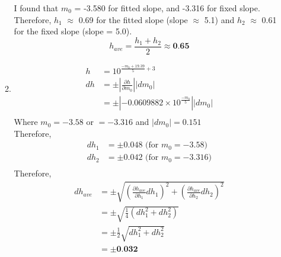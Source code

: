 \documentclass[10pt,letterpaper]{article}
\begin{document}
\begin{enumerate}
\begin{enumerate}
I found that $m_0$ = -3.580 for fitted slope, and -3.316 for fixed slope.\\

Therefore, $h_1$ $\approx$ 0.69 for the fitted slope (slope $\approx$ 5.1) and $h_2$ $\approx$ 0.61 for the fixed slope (slope = 5.0).\\

\begin{equation}\nonumber
h_{ave} = \frac{h_1 + h_2}{2} \approx \textbf{0.65}
\end{equation}

\item \begin{equation}\nonumber
\begin{split}
h & = 10^{\frac{- m_0+19.39}{5}+3}\\
dh & = \pm |\frac{\partial h}{\partial m_0}| |d m_0|\\
 & = \pm | -0.0609882 \times 10^{\frac{-m_0}{5}} | | d m_0 |\\
\end{split}
\end{equation}
Where $m_0 = -3.58$ or $= -3.316$ and $|d m_0| = 0.151$\\

Therefore,\\
\begin{equation}\nonumber
\begin{split}
dh_1 & = \pm 0.048 \text{ (for $m_0 = -3.58$)}\\
dh_2 & = \pm 0.042 \text{ (for $m_0 = -3.316$)}\\
\end{split}
\end{equation}
Therefore,\\
\begin{equation}\nonumber
\begin{split}
dh_{ave} & = \pm \sqrt{\left(\frac{\partial h_{ave}}{\partial h_1} dh_1\right)^2 + \left(\frac{\partial h_{ave}}{\partial h_2} dh_2 \right)^2}\\
 & = \pm \sqrt{\frac{1}{4}\left(dh_1^2 + dh_2^2\right)}\\
 & = \pm \frac{1}{2} \sqrt{dh_1^2 + dh_2^2}\\
 & = \pm \textbf{0.032}\\
\end{split}
\end{equation}
\end{enumerate}
\end{enumerate}
\end{document}
